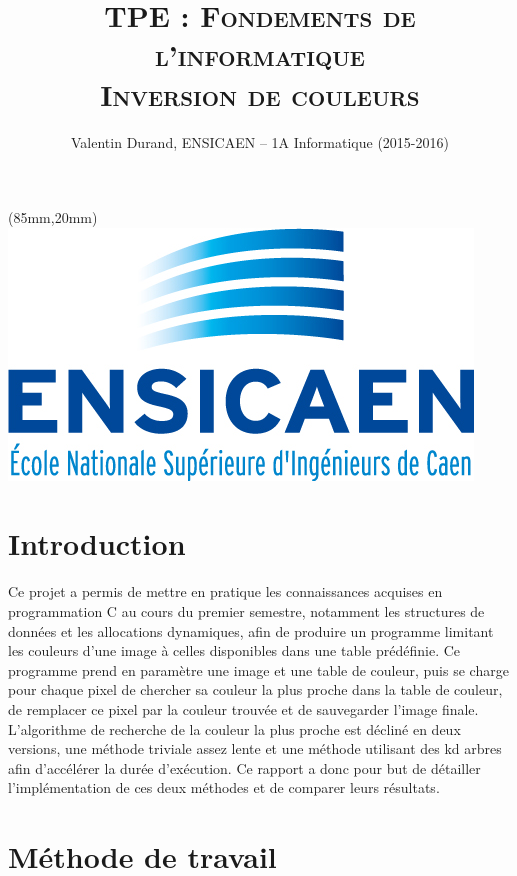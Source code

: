 \documentclass[a4paper,11pt,final]{article}
\title{TPE : \textsc{Fondements de l'informatique \\ Inversion de couleurs}}
\author{Valentin Durand, ENSICAEN -- 1A Informatique (2015-2016)}
\begin{document}
\begin{textblock*}{3cm}(85mm,20mm) 
	\includegraphics[scale=0.2]{./pic/logo-ensicaen-2015.jpg} 
\end{textblock*} 

\maketitle

\tableofcontents
\sloppy 
\cleardoublepage

\section*{Introduction}

Ce projet a permis de mettre en pratique les connaissances acquises en programmation C au cours du premier semestre, notamment les structures de données et les allocations dynamiques, afin de produire un programme limitant les couleurs d'une image à celles disponibles dans une table prédéfinie. Ce programme prend en paramètre une image et une table de couleur, puis se charge pour chaque pixel de chercher sa couleur la plus proche dans la table de couleur, de remplacer ce pixel par la couleur trouvée et de sauvegarder l’image finale. L’algorithme de recherche de la couleur la plus proche est décliné en deux versions, une méthode triviale assez lente et une méthode utilisant des kd arbres afin d’accélérer la durée d’exécution. Ce rapport a donc pour but de détailler l’implémentation de ces deux méthodes et de comparer leurs résultats.

\section{Méthode de travail}
\end{document}
